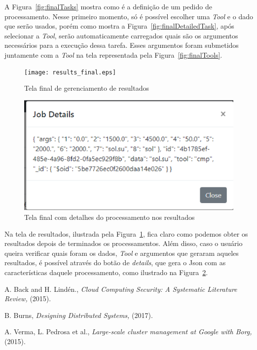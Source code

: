 \documentclass[11pt,twoside]{article}
\begin{document}
A Figura~\ref{fig:finalTasks} mostra como é a definição de um pedido de processamento. Nesse primeiro momento, só é possível escolher uma \emph{Tool} e o dado que serão usados, porém como mostra 
a Figura~\ref{fig:finalDetailedTask}, após selecionar a \emph{Tool}, serão automaticamente carregados quais são os argumentos necessários para a execução dessa tarefa. Esses argumentos
foram submetidos juntamente com a \emph{Tool} na tela representada pela Figura~\ref{fig:finalTools}.

\begin{figure}[!h]
  \centering
  \texttt{[image: results\_final.eps]}
  \caption{Tela final de gerenciamento de resultados}
  \label{fig:finalResults}
\end{figure}

\begin{figure}[!h]
  \centering
  \includegraphics[scale=0.6]{results_detail_final.eps}
  \caption{Tela final com detalhes do processamento nos resultados}
  \label{fig:finalResultsDetail}
\end{figure}

Na tela de resultados, ilustrada pela Figura~\ref{fig:finalResults}, fica claro como podemos obter os resultados depois de terminados os processamentos. Além disso, caso o usuário queira verificar 
quais foram os dados, \emph{Tool} e argumentos que geraram aqueles resultados, é possível através do botão de \emph{details}, que gera o Json com as características daquele processamento, como ilustrado na 
Figura~\ref{fig:finalResultsDetail}.

\begin{thebibliography}{99}

 A. Back and H. Lindén., {\it Cloud Computing Security: A Systematic Literature Review,} (2015).

 B. Burns, {\it Designing Distributed Systems,} (2017).

 A. Verma, L. Pedrosa  et al., {\it Large-scale cluster management at Google with Borg,} (2015).

\end{thebibliography}
\end{document}
